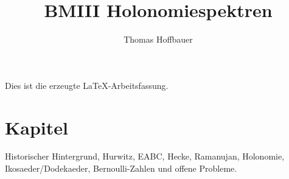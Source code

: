 \documentclass{article}
\begin{document}
\title{BMIII Holonomiespektren}
\author{Thomas Hoffbauer}
\maketitle
Dies ist die erzeugte LaTeX-Arbeitsfassung.
\section{Kapitel}
Historischer Hintergrund, Hurwitz, EABC, Hecke, Ramanujan, Holonomie,
Ikosaeder/Dodekaeder, Bernoulli-Zahlen und offene Probleme.
\end{document}
